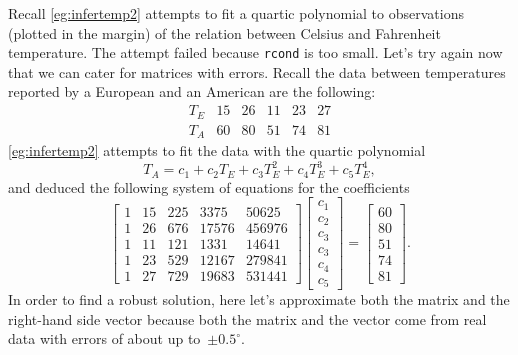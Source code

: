 \begin{example} \label{eg:}
Recall \autoref{eg:infertemp2} attempts to fit a quartic polynomial to observations (plotted in the margin) of the relation between Celsius and Fahrenheit temperature. 
The attempt failed because \verb|rcond| is too small.
Let's try again now that we can cater for matrices with errors.
Recall the data between temperatures reported by a European and an American are the following:
%
\begin{equation*}
\begin{array}{l|rrrrr}
T_E&15&26&11&23&27\\
T_A&60&80&51&74&81
\end{array}
\end{equation*}
\autoref{eg:infertemp2} attempts to fit the data with the quartic polynomial
\begin{equation*}
T_A=c_1+c_2T_E+c_3T_E^2+c_4T_E^3+c_5T_E^4,
\end{equation*}
and deduced the following system of equations for the coefficients
\begin{equation*}
\begin{bmatrix} 1&15&225&3375&50625
\\1&26&676&17576&456976
\\1&11&121&1331&14641
\\1&23&529&12167&279841
\\1&27&729&19683&531441 \end{bmatrix}
\begin{bmatrix} c_1\\c_2\\c_3\\c_3\\c_4\\c_5 \end{bmatrix}
=\begin{bmatrix} 60\\80\\51\\74\\81 \end{bmatrix}.
\end{equation*}
In order to find a robust solution, here let's approximate both the matrix and the right-hand side vector because both the matrix and the vector come from real data with errors of about up to~\(\pm0.5^\circ\).


\end{example}
